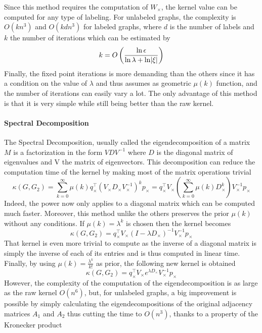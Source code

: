 \documentclass{article}
\DeclarePairedDelimiter{\abs}{\lvert}{\rvert}
\theoremstyle{definition}
\begin{document}
Since this method requires the computation of $W_\times$, the kernel value can be computed for any type of labeling. For unlabeled graphs, the complexity is $O(kn^3)$ and $O(kdn^3)$ for labeled graphs, where $d$ is the number of labels and $k$ the number of iterations which can be estimated by
\begin{equation}
	k=O\left(\frac{\ln \epsilon}{\ln \lambda + \ln \abs{\xi}}\right)
\end{equation}
Finally, the fixed point iterations is more demanding than the others since it has a condition on the value of $\lambda$ and thus assumes as geometric $\mu(k)$ function, and the number of iterations can easily vary a lot. The only advantage of this method is that it is very simple while still being better than the raw kernel.
\paragraph{Spectral Decomposition}
The Spectral Decomposition, usually called the eigendecomposition of a matrix $M$ is a factorization in the form $VDV^{-1}$ where $D$ is the diagonal matrix of eigenvalues and V the matrix of eigenvectors. This decomposition can reduce the computation time of the kernel by making most of the matrix operations trivial
\begin{equation}
	\kappa(G,G_2)=\sum\limits_{k=0}^{\infty}\mu(k)q_{\times}^{\top}(V_{\times}D_{\times}V_{\times}^{-1})^{k}p_{\times} = q_{\times}^{\top}V_{\times}\left(\sum\limits_{k=0}^{\infty}\mu(k)D_{\times}^{k}\right)V_{\times}^{-1}p_{\times}
\end{equation}
Indeed, the power now only applies to a diagonal matrix which can be computed much faster. Moreover, this method unlike the others preserves the prior $\mu(k)$ without any conditions. If $\mu(k)=\lambda^k$ is chosen then the kernel becomes
\begin{equation}
	\kappa(G,G_2)=q_{\times}^{\top}V_{\times}(I-\lambda D_{\times})^{-1}V_{\times}^{-1}p_{\times}
\end{equation}
That kernel is even more trivial to compute as the inverse of a diagonal matrix is simply the inverse of each of its entries and is thus computed in linear time. Finally, by using $\mu(k)=\frac{\lambda^k}{k!}$  as prior, the following new kernel is obtained
\begin{equation}
	\kappa(G,G_2)=q_{\times}^{\top}V_{\times}{e^{\lambda D_{\times}}}V_{\times}^{-1}p_{\times}
\end{equation}
However, the complexity of the computation of the eigendecomposition is as large as the raw kernel $O(n^6)$, but, for unlabeled graphs, a big improvement is possible by simply calculating the eigendecompositions of the original adjacency matrices $A_1$ and $A_2$ thus cutting the time to $O(n^3)$, thanks to a property of the Kronecker product
\end{document}
